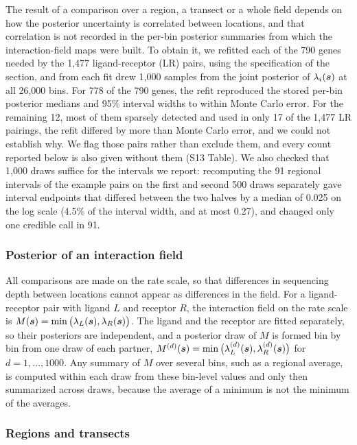 \documentclass[10pt,letterpaper]{article}
\begin{document}
The result of a comparison over a region, a transect or a whole field depends on how the posterior uncertainty is correlated between locations, and that correlation is not recorded in the per-bin posterior summaries from which the interaction-field maps were built. To obtain it, we refitted each of the 790 genes needed by the 1,477 ligand-receptor (LR) pairs, using the specification of the  section, and from each fit drew 1,000 samples from the joint posterior of $\lambda_i(\mbox{\boldmath $s$})$ at all 26,000 bins. For 778 of the 790 genes, the refit reproduced the stored per-bin posterior medians and 95\% interval widths to within Monte Carlo error. For the remaining 12, most of them sparsely detected and used in only 17 of the 1,477 LR pairings, the refit differed by more than Monte Carlo error, and we could not establish why. We flag those pairs rather than exclude them, and every count reported below is also given without them (S13 Table). We also checked that 1,000 draws suffice for the intervals we report: recomputing the 91 regional intervals of the example pairs on the first and second 500 draws separately gave interval endpoints that differed between the two halves by a median of 0.025 on the log scale (4.5\% of the interval width, and at most 0.27), and changed only one credible call in 91.

\subsubsection*{Posterior of an interaction field}

All comparisons are made on the rate scale, so that differences in sequencing depth between locations cannot appear as differences in the field. For a ligand-receptor pair with ligand $L$ and receptor $R$, the interaction field on the rate scale is $M(\mbox{\boldmath $s$}) = \min\big(\lambda_L(\mbox{\boldmath $s$}), \lambda_R(\mbox{\boldmath $s$})\big)$. The ligand and the receptor are fitted separately, so their posteriors are independent, and a posterior draw of $M$ is formed bin by bin from one draw of each partner, $M^{(d)}(\mbox{\boldmath $s$}) = \min\big(\lambda_L^{(d)}(\mbox{\boldmath $s$}), \lambda_R^{(d)}(\mbox{\boldmath $s$})\big)$ for $d = 1,\dots,1000$. Any summary of $M$ over several bins, such as a regional average, is computed within each draw from these bin-level values and only then summarized across draws, because the average of a minimum is not the minimum of the averages.

\subsubsection*{Regions and transects}
\end{document}
